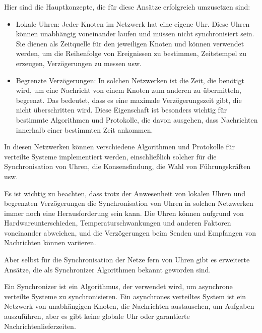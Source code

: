 Hier sind die Hauptkonzepte, die für diese Ansätze erfolgreich umzusetzen sind:
\begin{itemize}
\item Lokale Uhren: Jeder Knoten im Netzwerk hat eine eigene Uhr. Diese Uhren können unabhängig voneinander laufen und müssen nicht synchronisiert sein. Sie dienen als Zeitquelle für den jeweiligen Knoten und können verwendet werden, um die Reihenfolge von Ereignissen zu bestimmen, Zeitstempel zu erzeugen, Verzögerungen zu messen usw.
\item Begrenzte Verzögerungen: In solchen Netzwerken ist die Zeit, die benötigt wird, um eine Nachricht von einem Knoten zum anderen zu übermitteln, begrenzt. Das bedeutet, dass es eine maximale Verzögerungszeit gibt, die nicht überschritten wird. Diese Eigenschaft ist besonders wichtig für bestimmte Algorithmen und Protokolle, die davon ausgehen, dass Nachrichten innerhalb einer bestimmten Zeit ankommen.
\end{itemize}
In diesen Netzwerken können verschiedene Algorithmen und Protokolle für verteilte Systeme implementiert werden, einschließlich solcher für die Synchronisation von Uhren, die Konsensfindung, die Wahl von Führungskräften usw.

Es ist wichtig zu beachten, dass trotz der Anwesenheit von lokalen Uhren und begrenzten Verzögerungen die Synchronisation von Uhren in solchen Netzwerken immer noch eine Herausforderung sein kann. Die Uhren können aufgrund von Hardwareunterschieden, Temperaturschwankungen und anderen Faktoren voneinander abweichen, und die Verzögerungen beim Senden und Empfangen von Nachrichten können variieren.

Aber selbst für die Synchronisation der Netze fern von Uhren gibt es erweiterte Ansätze, die als Synchronizer Algorithmen bekannt geworden sind. 

Ein Synchronizer ist ein Algorithmus, der verwendet wird, um asynchrone verteilte Systeme zu synchronisieren. Ein asynchrones verteiltes System ist ein Netzwerk von unabhängigen Knoten, die Nachrichten austauschen, um Aufgaben auszuführen, aber es gibt keine globale Uhr oder garantierte Nachrichtenlieferzeiten.

